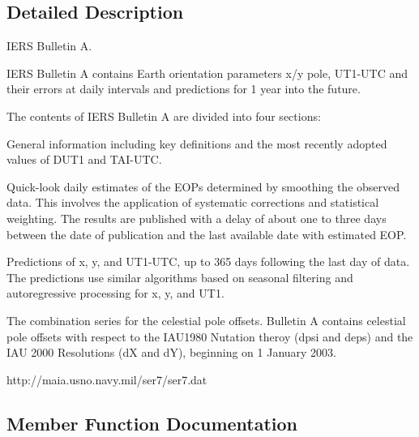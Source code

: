 \subsection{Detailed Description}
I\+E\+RS Bulletin A. 

I\+E\+RS Bulletin A contains Earth orientation parameters x/y pole, U\+T1-\/\+U\+TC and their errors at daily intervals and predictions for 1 year into the future.

The contents of I\+E\+RS Bulletin A are divided into four sections\+:


\begin{DoxyEnumerate}
\item General information including key definitions and the most recently adopted values of D\+U\+T1 and T\+A\+I-\/\+U\+TC.
\item Quick-\/look daily estimates of the E\+O\+Ps determined by smoothing the observed data. This involves the application of systematic corrections and statistical weighting. The results are published with a delay of about one to three days between the date of publication and the last available date with estimated E\+OP.
\item Predictions of x, y, and U\+T1-\/\+U\+TC, up to 365 days following the last day of data. The predictions use similar algorithms based on seasonal filtering and autoregressive processing for x, y, and U\+T1.
\item The combination series for the celestial pole offsets. Bulletin A contains celestial pole offsets with respect to the I\+A\+U1980 Nutation theroy (dpsi and deps) and the I\+AU 2000 Resolutions (dX and dY), beginning on 1 January 2003.
\end{DoxyEnumerate}

http\+://maia.usno.\+navy.\+mil/ser7/ser7.dat 

\subsection{Member Function Documentation}
\mbox{\label{classlibrary_1_1physics_1_1coord_1_1frame_1_1provider_1_1iers_1_1_bulletin_a_aa11bd395146f5fba123269de30353bcc}} 

